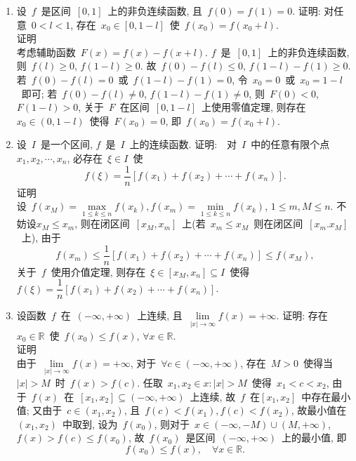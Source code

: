\documentclass[UTF8,a4paper,20pt]{article}
\begin{document}
\begin{enumerate}[1.]
\item 设~$f$~是区间~$[0,1]$~上的非负连续函数, 且~$f(0)=f(1)=0$. 证明: 对任意~$0<l<1$, 存在~$x_0\in[0,1-l]$~使~$f(x_0)=f(x_0+l)$.\\
{\heiti 证明}\\
考虑辅助函数~$F(x)=f(x)-f(x+l)$. $f$~是~$[0,1]$~上的非负连续函数, 则~$f(l)\geqslant0$, $f(1-l)\geqslant0$. 故~$f(0)-f(l)\leqslant 0$, $f(1-l)-f(1)\geqslant 0$. 若~$f(0)-f(l)=0$~或~$f(1-l)-f(1)=0$, 令~$x_0=0$~或~$x_0=1-l$~即可; 若~$f(0)-f(l)\neq 0$, $f(1-l)-f(1)\neq 0$, 则~$F(0)<0$, $F(1-l)>0$, 关于~$F$~在区间~$[0,1-l]$~上使用零值定理, 则存在~$x_0\in(0,1-l)$~使得~$F(x_0)=0$, 即~$f(x_0)=f(x_0+l)$.

\item 设~$I$~是一个区间, $f$~是~$I$~上的连续函数. 证明:　对~$I$~中的任意有限个点~$x_1, x_2, \cdots, x_n$, 必存在~$\xi\in I$~使
\[ f(\xi)=\dfrac{1}{n}[f(x_1)+f(x_2)+\cdots+f(x_n)]. \]
{\heiti 证明}\\
设~$f(x_M)=\max\limits_{1\leqslant k\leqslant n}f(x_k), f(x_m)=\min\limits_{1\leqslant k\leqslant n}f(x_k)$, $1\leqslant m,M\leqslant n$. 不妨设$x_M\leqslant x_m$, 则在闭区间~$[x_M,x_m]$~上(若~$x_m\leqslant x_M$~则在闭区间~$[x_m.x_M]$~上), 由于
\[f(x_m)\leqslant\dfrac{1}{n}[f(x_1)+f(x_2)+\cdots+f(x_n)]\leqslant f(x_M), \]
关于~$f$~使用介值定理, 则存在~$\xi\in[x_M,x_n]\subseteq I$~使得~$f(\xi)=\dfrac{1}{n}[f(x_1)+f(x_2)+\cdots+f(x_n)]$.

\item 设函数~$f$~在~$(-\infty,+\infty)$~上连续, 且~$\lim\limits_{|x|\to\infty}f(x)=+\infty$. 证明: 存在~$x_0\in\mathbb{R}$~使~$f(x_0)\leqslant f(x)$, $\forall x\in\mathbb{R}$.\\
{\heiti 证明}\\
由于~$\lim\limits_{|x|\to\infty}f(x)=+\infty$, 对于~$\forall c\in(-\infty,+\infty)$, 存在~$M>0$~使得当~$|x|>M$~时~$f(x)>f(c)$. 任取~$x_1,x_2\in{x: |x|>M}$~使得~$x_1<c<x_2$, 由于~$f(x)$~在~$[x_1,x_2]\subseteq(-\infty,+\infty)$~上连续, 故~$f$~在$[x_1,x_2]$~中存在最小值; 又由于~$c\in(x_1,x_2)$, 且~$f(c)<f(x_1), f(c)<f(x_2)$, 故最小值在~$(x_1,x_2)$~中取到, 设为~$f(x_0)$, 则对于~$x\in(-\infty, -M)\cup(M, +\infty)$, $f(x)>f(c)\leqslant f(x_0)$, 故~$f(x_0)$~是区间~$(-\infty, +\infty)$~上的最小值, 即
\[f(x_0)\leqslant f(x), \quad\forall x\in\mathbb{R}.\]


\end{enumerate}
\end{document}
